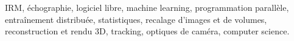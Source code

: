 




IRM, échographie, logiciel libre, machine learning, programmation parallèle, entraînement distribuée, statistiques, recalage d'images et de volumes, reconstruction et rendu 3D, tracking, optiques de caméra, computer science.


